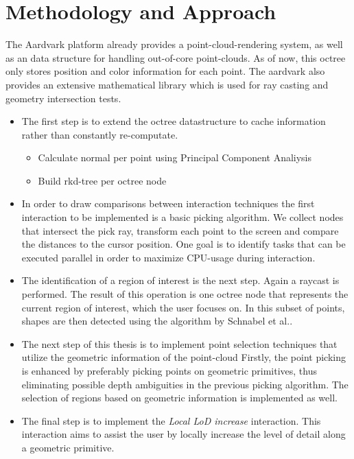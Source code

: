 \section{Methodology and Approach}

The Aardvark platform already provides a point-cloud-rendering system, as well as an data structure for handling out-of-core point-clouds. As of now, this octree only stores position and color information for each point. The aardvark also provides an extensive mathematical library which is used for ray casting and geometry intersection tests. 
\\
\begin{itemize}
\item 
The first step is to extend the octree datastructure to cache information rather than constantly re-computate. 
\begin{itemize}
	\item Calculate normal per point using Principal Component Analiysis\cite{jolliffe2002principal} 
	\item Build rkd-tree\cite{tobler2011rkd} per octree node
\end{itemize}
\item 
In order to draw comparisons between interaction techniques the first interaction to be implemented is a basic picking algorithm. We collect nodes that intersect the pick ray, transform each point to the screen and compare the distances to the cursor position. One goal is to identify tasks that can be executed parallel in order to maximize CPU-usage during interaction. 
\item 
The identification of a region of interest is the next step. Again a raycast is performed. The result of this operation is one octree node that represents the current region of interest, which the user focuses on. In this subset of points, shapes are then detected using the algorithm by Schnabel et al.\cite{schnabel-2007-efficient}.
\item
The next step of this thesis is to implement point selection techniques that utilize the geometric information of the point-cloud
Firstly, the point picking is enhanced by preferably picking points on geometric primitives, thus eliminating possible depth ambiguities in the previous picking algorithm. 
The selection of regions based on geometric information is implemented as well.
\item
The final step is to implement the \textit{Local LoD increase} interaction. This interaction aims to assist the user by locally increase the level of detail along a geometric primitive. 

\end{itemize}